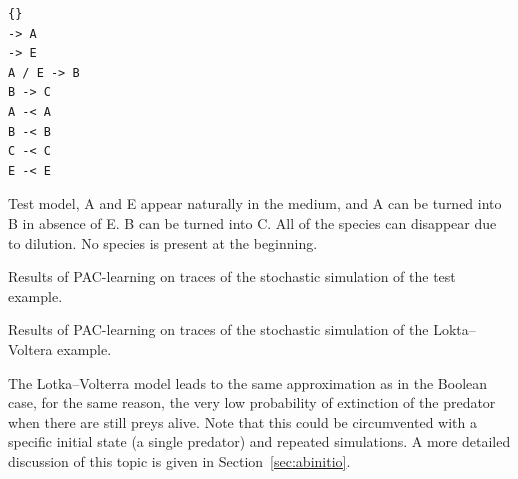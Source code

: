 \documentclass{llncs}
\newif\ifcomments%
\newcommand{\sylvain}[1]{\ifcomments\textcolor{green}{#1}\fi}
\begin{document}
\begin{listfig}[htb]
   \begin{lstlisting}
{}
-> A
-> E
A / E -> B
B -> C
A -< A
B -< B
C -< C
E -< E
   \end{lstlisting}
	\caption{Test model, A and E appear naturally in the medium, and A can be turned into B in absence of E. B  can be turned into C. All of the species can disappear due to dilution. No species is present at the beginning.\label{test}}
\end{listfig}
\begin{listfig}[htb]
	
	\caption{Results of PAC-learning on traces of the stochastic simulation of the
		test example.\label{test_res}}
\end{listfig}



% 	

\begin{listfig}[htb]
	
	\caption{Results of PAC-learning on traces of the stochastic simulation of the
		Lokta--Voltera example.\label{preypred_res}}
\end{listfig}

The Lotka--Volterra model leads to the same approximation as in the
Boolean case, for the same reason, the very low probability of extinction of
the predator when there are still preys alive. Note that this could be
circumvented with a specific initial state (a single predator) and repeated
simulations. A more detailed discussion of this topic is given in
Section~\ref{sec:abinitio}.
\end{document}
